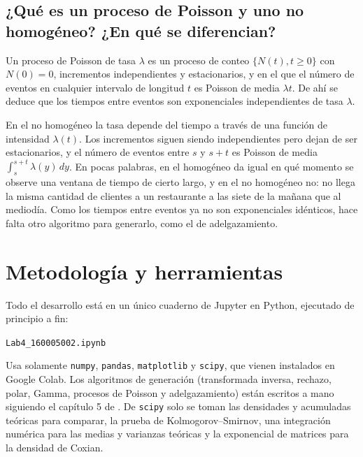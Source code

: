 \documentclass[11pt,letterpaper]{article}
\newcommand{\codigoEstudiante}{160005002}
\begin{document}
\subsection{¿Qué es un proceso de Poisson y uno no homogéneo? ¿En qué se diferencian?}

Un proceso de Poisson de tasa $\lambda$ es un proceso de conteo $\{N(t), t \ge 0\}$ con $N(0) = 0$,
incrementos independientes y estacionarios, y en el que el número de eventos en cualquier intervalo de
longitud $t$ es Poisson de media $\lambda t$. De ahí se deduce que los tiempos entre eventos son
exponenciales independientes de tasa $\lambda$.

En el no homogéneo la tasa depende del tiempo a través de una función de intensidad $\lambda(t)$. Los
incrementos siguen siendo independientes pero dejan de ser estacionarios, y el número de eventos entre
$s$ y $s+t$ es Poisson de media $\int_s^{s+t}\lambda(y)\,dy$. En pocas palabras, en el homogéneo da
igual en qué momento se observe una ventana de tiempo de cierto largo, y en el no homogéneo no: no
llega la misma cantidad de clientes a un restaurante a las siete de la mañana que al mediodía. Como los
tiempos entre eventos ya no son exponenciales idénticos, hace falta otro algoritmo para generarlo, como
el de adelgazamiento.

\section{Metodología y herramientas}

Todo el desarrollo está en un único cuaderno de Jupyter en Python, ejecutado de principio a fin:

\begin{center}
\texttt{Lab4\_\codigoEstudiante.ipynb}
\end{center}

Usa solamente \texttt{numpy}, \texttt{pandas}, \texttt{matplotlib} y \texttt{scipy}, que vienen
instalados en Google Colab. Los algoritmos de generación (transformada inversa, rechazo, polar,
Gamma, procesos de Poisson y adelgazamiento) están escritos a mano siguiendo el capítulo 5 de
\cite{ross99}. De \texttt{scipy} solo se toman las densidades y acumuladas teóricas para comparar, la
prueba de Kolmogorov--Smirnov, una integración numérica para las medias y varianzas teóricas y la
exponencial de matrices para la densidad de Coxian.
\end{document}
